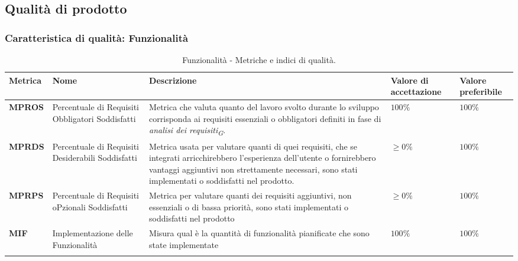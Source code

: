 \subsection{Qualità di prodotto}

\subsubsection{Caratteristica di qualità: Funzionalità}
\hspace{1pt}
    \begin{longtable}{|C{1.5cm}|L{3cm}|L{4cm}|L{2.5cm}|L{2.5cm}|}
        \hline
        \textbf{Metrica} & \textbf{Nome} & \textbf{Descrizione} & \textbf{Valore di accettazione} & \textbf{Valore preferibile} \\
        \hline
        \textbf{MPROS} & Percentuale di Requisiti Obbligatori Soddisfatti & Metrica che valuta quanto del lavoro svolto durante lo sviluppo corrisponda ai requisiti essenziali o obbligatori definiti in fase di \textit{analisi dei requisiti}\textsubscript{\textit{G}}.  & $ 100\%$  & $ 100\%$ \\
        \hline
        \textbf{MPRDS} & Percentuale di Requisiti Desiderabili Soddisfatti & Metrica usata per valutare quanti di quei requisiti, che se integrati arricchirebbero l'esperienza dell'utente o fornirebbero vantaggi aggiuntivi non strettamente necessari, sono stati implementati o soddisfatti nel prodotto. & $\geq 0\%$ & $100\%$ \\
        \hline
        \textbf{MPRPS} & Percentuale di Requisiti oPzionali Soddisfatti & Metrica per valutare quanti dei requisiti aggiuntivi, non essenziali o di bassa priorità, sono stati implementati o soddisfatti nel prodotto & $\geq 0\%$ & $100\%$ \\
        \hline
        \textbf{MIF} & Implementazione delle Funzionalità & Misura qual è la quantità di funzionalità pianificate che sono state implementate & $ 100\%$ & $ 100\%$ \\
        \hline
        \caption{Funzionalità - Metriche e indici di qualità.}
        \label{tab:metriche_funzionalità_testo}
    \end{longtable}

